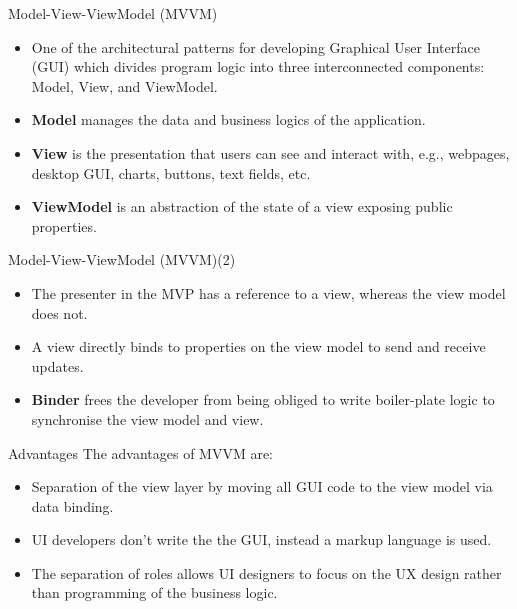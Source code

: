 \documentclass[aspectratio=169, table]{beamer}
\begin{document}
	\begin{frame}{Model-View-ViewModel (MVVM) }
		\begin{itemize}
			\item One of the architectural patterns for developing Graphical User Interface (GUI) which divides program logic into three interconnected components: Model, View, and ViewModel.
			\item \textbf{Model} manages the data and business logics of the application.
			\item \textbf{View} is the presentation that users can see and interact with, e.g., webpages, desktop GUI, charts, buttons, text fields, etc.
			\item \textbf{ViewModel} is an abstraction of the state of a view exposing public properties.


		\end{itemize}
	\end{frame}


	\begin{frame}{Model-View-ViewModel (MVVM)(2)}
		\begin{itemize}
			\item The presenter in the MVP has a reference to a view, whereas the view model does not.
			\item A view directly binds to properties on the view model to send and receive updates.
			\item \textbf{Binder} frees the developer from being obliged to write boiler-plate logic to synchronise the view model and view.

		\end{itemize}
	\end{frame}


	\begin{frame}{Advantages}
		The advantages of MVVM are:
		\begin{itemize}
			\item Separation of the view layer by moving all GUI code to the view model via data binding.
			\item UI developers don't write the the GUI, instead a markup language is used.
			\item The separation of roles allows UI designers to focus on the UX design rather than programming of the business logic.


		\end{itemize}
	\end{frame}
\end{document}
